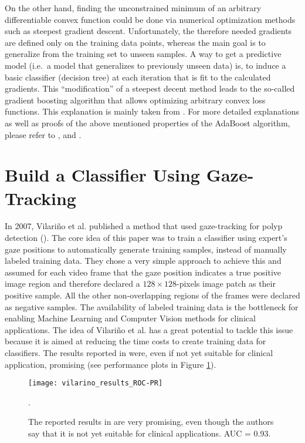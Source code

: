 On the other hand, finding the unconstrained minimum of an arbitrary differentiable convex function could be done via numerical optimization methods such as steepest gradient descent. 
Unfortunately, the therefore needed gradients are defined only on the training data points, whereas the main goal is to generalize from the training set to unseen samples. 
A way to get a predictive model (i.e.\ a model that generalizes to previously unseen data) is, to induce a basic classifier (decision tree) at each iteration that is fit to the calculated gradients. This ``modification'' of a steepest decent method leads to the so-called gradient boosting algorithm that allows optimizing arbitrary convex loss functions.
This explanation is mainly taken from \cite{friedman2009elements}. For more detailed explanations as well as proofs of the above mentioned properties of the AdaBoost algorithm, please refer to \cite[Chapter~10]{friedman2009elements}, \cite{mason1999boosting} and \cite{friedman2001greedy}.

\section{Build a Classifier Using Gaze-Tracking}
In 2007, Vilari\~no et al. published a method that used gaze-tracking for polyp detection (\cite{vilarino2007automatic}). 
The core idea of this paper was to train a classifier using expert's gaze positions to automatically generate training samples, instead of manually labeled training data. 
They chose a very simple approach to achieve this and assumed for each video frame that the gaze position indicates a true positive image region and therefore declared a $128\times128$-pixels image patch as their positive sample. All the other non-overlapping regions of the frames were declared as negative samples.
The availability of labeled training data is the bottleneck for enabling Machine Learning and Computer Vision methods for clinical applications. 
The idea of Vilari\~no et al. has a great potential to tackle this issue because it is aimed at reducing the time costs to create training data for classifiers. 
The results reported in \cite{vilarino2007automatic} were, even if not yet suitable for clinical application, promising (see performance plots in Figure \ref{fig:vilarino-results}).
\begin{figure}[ht]
	\centering
	\texttt{[image: vilarino\_results\_ROC-PR]}
	\caption{The reported results in \cite{vilarino2007automatic} are very promising, even though the authors say that it is not yet suitable for clinical applications. AUC = 0.93.}.
	\label{fig:vilarino-results}
\end{figure}


